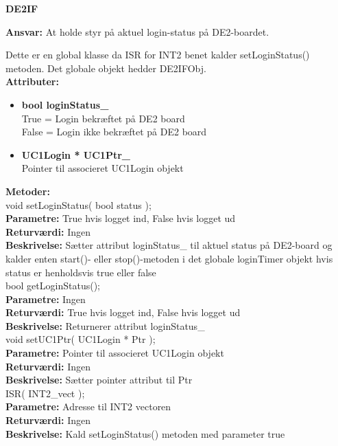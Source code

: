 %
%
{\centering
\textbf{DE2IF}\par
}
\textbf{Ansvar:} At holde styr på aktuel login-status på DE2-boardet.

Dette er en global klasse da ISR for INT2 benet kalder setLoginStatus() metoden. Det globale objekt hedder DE2IFObj. \\
\textbf{Attributer:}
\begin{itemize}
	\item \textbf{bool loginStatus\_} \\
	True = Login bekræftet på DE2 board \\
	False = Login ikke bekræftet på DE2 board
	\item \textbf{UC1Login * UC1Ptr\_} \\
	Pointer til associeret UC1Login objekt
\end{itemize}

\textbf{Metoder:} \\
void setLoginStatus( bool status ); \\
\textbf{Parametre:} True hvis logget ind, False hvis logget ud \\
\textbf{Returværdi:} Ingen \\
\textbf{Beskrivelse:} Sætter attribut loginStatus\_ til aktuel status på DE2-board og kalder enten start()- eller stop()-metoden i det globale loginTimer objekt hvis status er henholdsvis true eller false \\

bool getLoginStatus(); \\
\textbf{Parametre:} Ingen \\
\textbf{Returværdi:} True hvis logget ind, False hvis logget ud \\
\textbf{Beskrivelse:} Returnerer attribut loginStatus\_ \\

void setUC1Ptr( UC1Login * Ptr ); \\
\textbf{Parametre:} Pointer til associeret UC1Login objekt \\
\textbf{Returværdi:} Ingen \\
\textbf{Beskrivelse:} Sætter pointer attribut til Ptr \\

ISR( INT2\_vect ); \\
\textbf{Parametre:} Adresse til INT2 vectoren \\
\textbf{Returværdi:} Ingen \\
\textbf{Beskrivelse:} Kald setLoginStatus() metoden med parameter true \\


